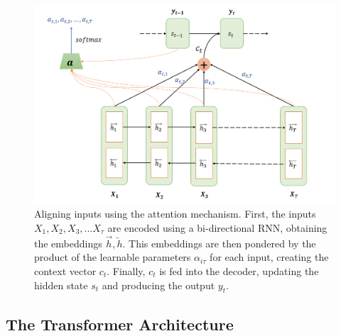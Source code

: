 \begin{figure}[!h]
	\centering
	\includegraphics[width=0.7\linewidth]{figures/alignment_attention}
	\caption{Aligning inputs using the attention mechanism. First, the inputs $X_1, X_2, X_3, ... X_{\tau}$ are encoded using a bi-directional RNN, obtaining the embeddings $\overrightarrow{h} , \overleftarrow{h}$. This embeddings are then pondered by the product of the learnable parameters $\alpha_{i \tau}$ for each input, creating the context vector $c_t$. Finally, $c_t$ is fed into the decoder, updating the hidden state $s_t$ and producing the output $y_t$.}
	\label{fig:alignmentattention}
\end{figure}


\subsection{The Transformer Architecture}
\label{sec:transformer}

